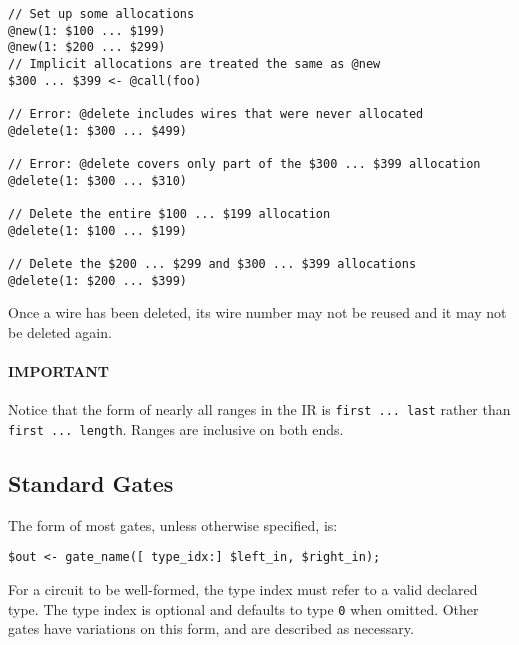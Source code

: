 %
\begin{lstlisting}[language=ir]
// Set up some allocations
@new(1: $100 ... $199)
@new(1: $200 ... $299)
// Implicit allocations are treated the same as @new
$300 ... $399 <- @call(foo)

// Error: @delete includes wires that were never allocated
@delete(1: $300 ... $499)

// Error: @delete covers only part of the $300 ... $399 allocation
@delete(1: $300 ... $310)

// Delete the entire $100 ... $199 allocation
@delete(1: $100 ... $199)

// Delete the $200 ... $299 and $300 ... $399 allocations
@delete(1: $200 ... $399)
\end{lstlisting}

Once a wire has been deleted, its wire number may not be reused and it may not be deleted again.

\paragraph{IMPORTANT} Notice that the form of nearly all ranges in the IR is \texttt{first ... last} rather than \texttt{first ... length}.
Ranges are inclusive on both ends.


\subsection{Standard Gates}
\label{subsec:standardgates}
The form of most gates, unless otherwise specified, is:
\begin{lstlisting}[language=ir]
$out <- gate_name([ type_idx:] $left_in, $right_in);
\end{lstlisting}
For a circuit to be well-formed, the type index must refer to a valid declared type.
The type index is optional and defaults to type \texttt{0} when omitted.
Other gates have variations on this form, and are described as necessary.\\

